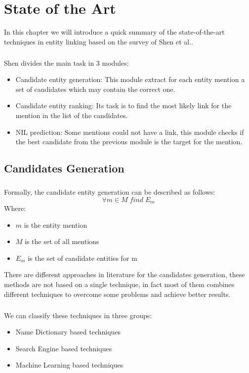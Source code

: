 \chapter{State of the Art}
In this chapter we will introduce a quick summary of the state-of-the-art techniques in entity linking based on the survey of Shen et al.\cite{shen2015entity}.
\paragraph{}
Shen divides the main task in 3 modules:
\begin{itemize}
\item Candidate entity generation: This module extract for each entity mention a set of candidates which may contain the correct one.
\item Candidate entity ranking: Its task is to find the most likely link for the mention in the list of the candidates.
\item NIL prediction: Some mentions could not have a link, this module checks if the best candidate from the previous module is the target for the mention. 
\end{itemize}

\section{Candidates Generation}
\paragraph{}
Formally, the candidate entity generation can be described as follows:
\[\forall m \in M \; find \; E_m\]
Where:

\begin{itemize}[noitemsep,  topsep=10pt]
\item $m$ is the entity mention
\item $M$ is the set of all mentions
\item $E_m$ is the set of candidate entities for m
\end{itemize}

There are different approaches in literature for the candidates generation, these methods are not based on a single technique, in fact most of them combines different techniques to overcome some problems and achieve better results.

\paragraph{}
We can classify these techniques in three groups:
\begin{itemize}[noitemsep,  topsep=10pt]
\item Name Dictionary based techniques
\item Search Engine based techniques
\item Machine Learning based techniques
\end{itemize}

